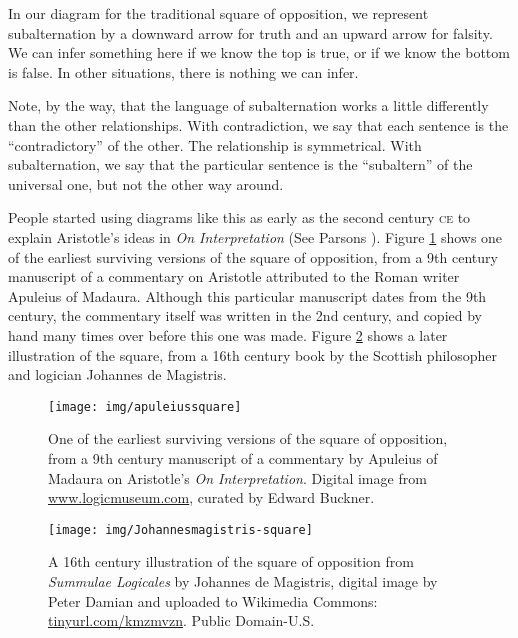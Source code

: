 In our diagram for the traditional square of opposition, we represent subalternation by a downward arrow for truth and an upward arrow for falsity. We can infer something here if we know the top is true, or if we know the bottom is false. In other situations, there is nothing we can infer. 

Note, by the way, that the language of subalternation works a little differently than the other relationships. With contradiction, we say that each sentence is the ``contradictory'' of the other. The relationship is symmetrical. With subalternation, we say that the particular sentence is the ``subaltern'' of the universal one, but not the other way around.  

People started using diagrams like this as early as the second century \textsc{ce} to explain Aristotle's ideas in \textit{On Interpretation} (See Parsons \citeyear{Parsons1997}). Figure \ref{fig:apuleiussquare} shows one of the earliest surviving versions of the square of opposition, from a 9th century manuscript of a commentary on Aristotle attributed to the Roman writer Apuleius of Madaura. Although this particular manuscript dates from the 9th century, the commentary itself was written in the 2nd century, and copied by hand many times over before this one was made. Figure \ref{fig:majorsquare} shows a later illustration of the square, from a 16th century book by the Scottish philosopher and logician Johannes de Magistris.

\begin{figure}
\begin{mdframed}[style=mytableclearbox]
\begin{center}
\texttt{[image: img/apuleiussquare]}
\end{center}
\end{mdframed}
\caption{One of the earliest surviving versions of the square of opposition, from a 9th century manuscript of a commentary by Apuleius of Madaura on Aristotle's \textit{On Interpretation}. Digital image from \protect\url{www.logicmuseum.com}, curated by Edward Buckner.}
\label{fig:apuleiussquare}
\end{figure}


\begin{figure}
\begin{mdframed}[style=mytableclearbox]
\begin{center}
\texttt{[image: img/Johannesmagistris-square]}
\end{center}
\end{mdframed}
\caption{A 16th century illustration of the square of opposition from \textit{Summulae Logicales} by Johannes de Magistris, digital image by Peter Damian and uploaded to Wikimedia Commons: \protect\url{tinyurl.com/kmzmvzn}. Public Domain-U.S. }
\label{fig:majorsquare}
\end{figure}

